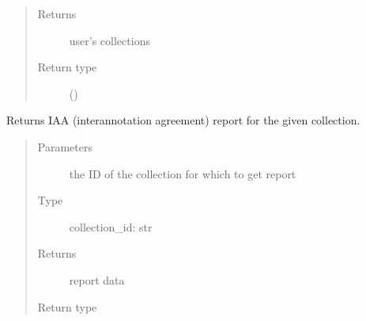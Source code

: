 \documentclass[letterpaper,10pt,english]{sphinxmanual}
\begin{document}
\begin{fulllineitems}
\begin{fulllineitems}
\begin{quote}
\begin{description}
\begin{itemize}
\end{itemize}

\item[{Returns}] \leavevmode
\sphinxAtStartPar
user’s collections

\item[{Return type}] \leavevmode
\sphinxAtStartPar
{}()

\end{description}\end{quote}

\end{fulllineitems}


\begin{fulllineitems}
\label{\detokenize{autoapi/pine/client/client/index:pine.client.client.PineClient.get_collection_iaa_report}}
\sphinxAtStartPar
Returns IAA (inter\sphinxhyphen{}annotation agreement) report for the given collection.
\begin{quote}\begin{description}
\item[{Parameters}] \leavevmode
\sphinxAtStartPar
{} \textendash{} the ID of the collection for which to get report

\item[{Type}] \leavevmode
\sphinxAtStartPar
collection\_id: str

\item[{Returns}] \leavevmode
\sphinxAtStartPar
report data

\item[{Return type}] \leavevmode
\sphinxAtStartPar
{}

\end{description}\end{quote}


\end{fulllineitems}
\end{fulllineitems}
\end{document}
